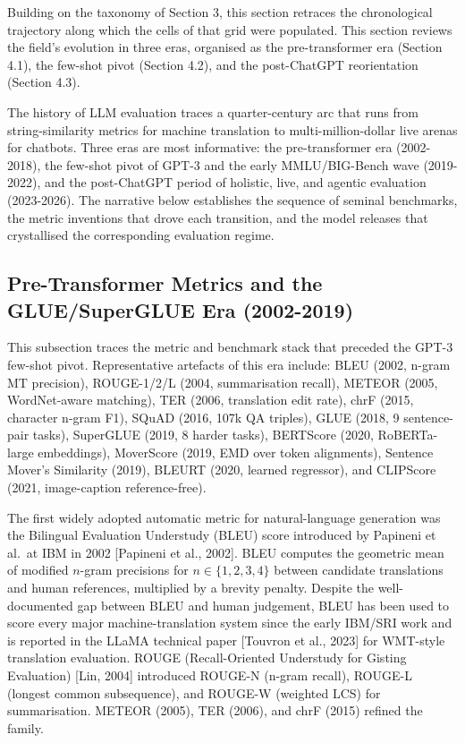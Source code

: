 Building on the taxonomy of Section 3, this section retraces the chronological trajectory along which the cells of that grid were populated. This section reviews the field's evolution in three eras, organised as the pre-transformer era (Section 4.1), the few-shot pivot (Section 4.2), and the post-ChatGPT reorientation (Section 4.3).

The history of LLM evaluation traces a quarter-century arc that runs from string-similarity metrics for machine translation to multi-million-dollar live arenas for chatbots. Three eras are most informative: the pre-transformer era (2002-2018), the few-shot pivot of GPT-3 and the early MMLU/BIG-Bench wave (2019-2022), and the post-ChatGPT period of holistic, live, and agentic evaluation (2023-2026). The narrative below establishes the sequence of seminal benchmarks, the metric inventions that drove each transition, and the model releases that crystallised the corresponding evaluation regime.

\subsection{Pre-Transformer Metrics and the GLUE/SuperGLUE Era (2002-2019)}\label{pre-transformer-metrics-and-the-gluesuperglue-era-2002-2019}

This subsection traces the metric and benchmark stack that preceded the GPT-3 few-shot pivot. Representative artefacts of this era include: BLEU (2002, n-gram MT precision), ROUGE-1/2/L (2004, summarisation recall), METEOR (2005, WordNet-aware matching), TER (2006, translation edit rate), chrF (2015, character n-gram F1), SQuAD (2016, 107k QA triples), GLUE (2018, 9 sentence-pair tasks), SuperGLUE (2019, 8 harder tasks), BERTScore (2020, RoBERTa-large embeddings), MoverScore (2019, EMD over token alignments), Sentence Mover's Similarity (2019), BLEURT (2020, learned regressor), and CLIPScore (2021, image-caption reference-free).

The first widely adopted automatic metric for natural-language generation was the Bilingual Evaluation Understudy (BLEU) score introduced by Papineni et al.~at IBM in 2002 {[}Papineni et al., 2002{]}. BLEU computes the geometric mean of modified \(n\)-gram precisions for \(n \in \{1, 2, 3, 4\}\) between candidate translations and human references, multiplied by a brevity penalty. Despite the well-documented gap between BLEU and human judgement, BLEU has been used to score every major machine-translation system since the early IBM/SRI work and is reported in the LLaMA technical paper {[}Touvron et al., 2023{]} for WMT-style translation evaluation. ROUGE (Recall-Oriented Understudy for Gisting Evaluation) {[}Lin, 2004{]} introduced ROUGE-N (n-gram recall), ROUGE-L (longest common subsequence), and ROUGE-W (weighted LCS) for summarisation. METEOR (2005), TER (2006), and chrF (2015) refined the family.

